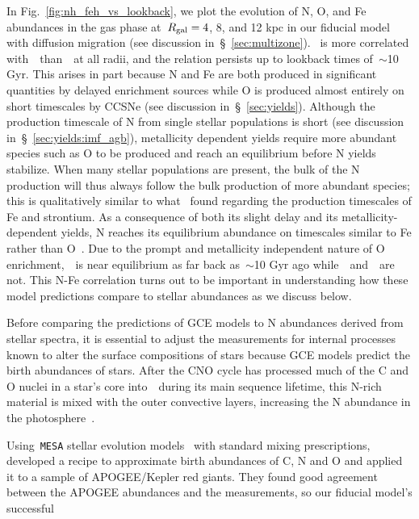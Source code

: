 \documentclass[ms.tex]{subfiles}
\begin{document}
In Fig.~\ref{fig:nh_feh_vs_lookback}, we plot the evolution of N, O, and Fe
abundances in the gas phase at~$R_\text{gal} = 4$, 8, and 12 kpc in our fiducial model
with diffusion migration (see discussion in~\S~\ref{sec:multizone}).
\nh~is more correlated with~\feh~than~\oh~at all radii, and the relation
persists up to lookback times of~$\sim$10 Gyr.
This arises in part because N and Fe are both produced in significant
quantities by delayed enrichment sources while O is produced almost entirely on
short timescales by CCSNe (see discussion in~\S~\ref{sec:yields}).
Although the production timescale of N from single stellar populations is
short (see discussion in~\S~\ref{sec:yields:imf_agb}), metallicity dependent
yields require more abundant species such as O to be produced and reach an
equilibrium before N yields stabilize.
When many stellar populations are present, the bulk of the N production will
thus always follow the bulk production of more abundant species; this is 
qualitatively similar to what~\citet{Johnson2020} found regarding the
production timescales of Fe and strontium.
As a consequence of both its slight delay and its metallicity-dependent
yields, N reaches its equilibrium abundance on timescales similar to Fe rather
than O~\citep{Weinberg2017}.
Due to the prompt and metallicity independent nature of O enrichment,~\oh~is
near equilibrium as far back as~$\sim$10 Gyr ago while~\nh~and~\feh~are not.
This N-Fe correlation turns out to be important in understanding how these
model predictions compare to stellar abundances as we discuss below.
\par
Before comparing the predictions of GCE models to N abundances derived from
stellar spectra, it is essential to adjust the measurements for internal
processes known to alter the surface compositions of stars because GCE models
predict the birth abundances of stars.
After the CNO cycle has processed much of the C and O nuclei in a star's core
into~\Nfourteen~during its main sequence lifetime, this N-rich material is
mixed with the outer convective layers, increasing the N abundance in the
photosphere~\citep{Gilroy1989, Korn2007, Lind2008, Souto2018, Souto2019}.
\par
Using~\texttt{MESA} stellar evolution models~\citep{Paxton2011, Paxton2013,
Paxton2015, Paxton2018} with standard mixing prescriptions,~\citet{Vincenzo2021}
developed a recipe to approximate birth abundances of C, N and O and applied it
to a sample of APOGEE/Kepler red giants.
They found good agreement between the APOGEE abundances and the
\citet{Dopita2016} measurements, so our fiducial model's successful
\end{document}

